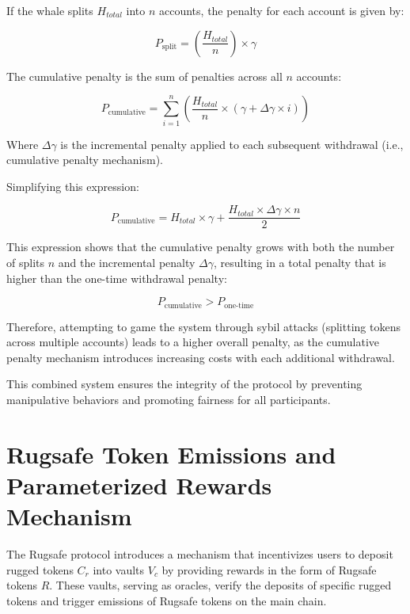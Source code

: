 \documentclass{article}
\begin{document}
If the whale splits $H_{total}$ into $n$ accounts, the penalty for each account is given by:

\[
P_{\text{split}} = \left(\frac{H_{total}}{n}\right) \times \gamma
\]

The cumulative penalty is the sum of penalties across all $n$ accounts:

\[
P_{\text{cumulative}} = \sum_{i=1}^{n} \left( \frac{H_{total}}{n} \times \left( \gamma + \Delta \gamma \times i \right) \right)
\]

Where $\Delta \gamma$ is the incremental penalty applied to each subsequent withdrawal (i.e., cumulative penalty mechanism).

Simplifying this expression:

\[
P_{\text{cumulative}} = H_{total} \times \gamma + \frac{H_{total} \times \Delta \gamma \times n}{2}
\]

This expression shows that the cumulative penalty grows with both the number of splits $n$ and the incremental penalty $\Delta \gamma$, resulting in a total penalty that is higher than the one-time withdrawal penalty:

\[
P_{\text{cumulative}} > P_{\text{one-time}}
\]

Therefore, attempting to game the system through sybil attacks (splitting tokens across multiple accounts) leads to a higher overall penalty, as the cumulative penalty mechanism introduces increasing costs with each additional withdrawal.

This combined system ensures the integrity of the protocol by preventing manipulative behaviors and promoting fairness for all participants.












\section{Rugsafe Token Emissions and Parameterized Rewards Mechanism}

The Rugsafe protocol introduces a mechanism that incentivizes users to deposit rugged tokens $C_r$ into vaults $V_c$ by providing rewards in the form of Rugsafe tokens $R$. These vaults, serving as oracles, verify the deposits of specific rugged tokens and trigger emissions of Rugsafe tokens on the main chain.
\end{document}
